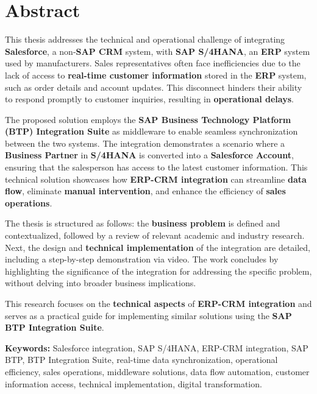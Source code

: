 
\chapter*{Abstract}

This thesis addresses the technical and operational challenge of integrating \textbf{Salesforce}, a non-\textbf{SAP CRM} system, with \textbf{SAP S/4HANA}, an \textbf{ERP} system used by manufacturers. Sales representatives often face inefficiencies due to the lack of access to \textbf{real-time customer information} stored in the \textbf{ERP} system, such as order details and account updates. This disconnect hinders their ability to respond promptly to customer inquiries, resulting in \textbf{operational delays}.

\vspace{0.5cm} %

The proposed solution employs the \textbf{SAP Business Technology Platform (BTP) Integration Suite} as middleware to enable seamless synchronization between the two systems. The integration demonstrates a scenario where a \textbf{Business Partner} in \textbf{S/4HANA} is converted into a \textbf{Salesforce Account}, ensuring that the salesperson has access to the latest customer information. This technical solution showcases how \textbf{ERP-CRM integration} can streamline \textbf{data flow}, eliminate \textbf{manual intervention}, and enhance the efficiency of \textbf{sales operations}.

\vspace{0.5cm} %

The thesis is structured as follows: the \textbf{business problem} is defined and contextualized, followed by a review of relevant academic and industry research. Next, the design and \textbf{technical implementation} of the integration are detailed, including a step-by-step demonstration via video. The work concludes by highlighting the significance of the integration for addressing the specific problem, without delving into broader business implications.

\vspace{0.5cm} %

This research focuses on the \textbf{technical aspects} of \textbf{ERP-CRM integration} and serves as a practical guide for implementing similar solutions using the \textbf{SAP BTP Integration Suite}.


\vfill %


\par
\textbf{Keywords:} Salesforce integration, SAP S/4HANA, ERP-CRM integration, SAP BTP, BTP Integration Suite, real-time data synchronization, operational efficiency, sales operations, middleware solutions, data flow automation, customer information access, technical implementation, digital transformation.

